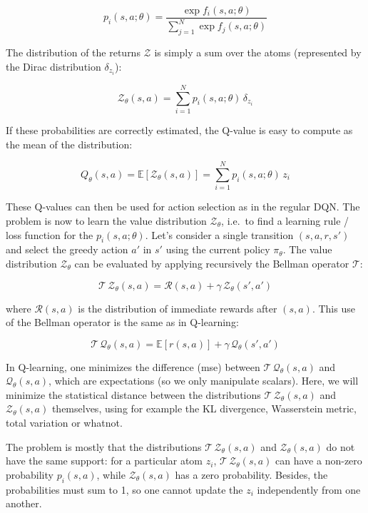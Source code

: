 \documentclass[
  letterpaper,
  DIV=11,
  numbers=noendperiod]{scrreprt}
\begin{document}
\[
    p_i(s, a; \theta) = \frac{\exp f_i(s, a; \theta)}{\sum_{j=1}^{N} \exp f_j(s, a; \theta)}
\]

The distribution of the returns \(\mathcal{Z}\) is simply a sum over the
atoms (represented by the Dirac distribution \(\delta_{z_i}\)):

\[
    \mathcal{Z}_\theta(s, a) = \sum_{i=1}^{N} p_i(s, a; \theta) \, \delta_{z_i}
\]

If these probabilities are correctly estimated, the Q-value is easy to
compute as the mean of the distribution:

\[
    Q_\theta(s, a) = \mathbb{E} [\mathcal{Z}_\theta(s, a)] = \sum_{i=1}^{N} p_i(s, a; \theta) \, z_i
\]

These Q-values can then be used for action selection as in the regular
DQN. The problem is now to learn the value distribution
\(\mathcal{Z}_\theta\), i.e.~to find a learning rule / loss function for
the \(p_i(s, a; \theta)\). Let's consider a single transition
\((s, a, r, s')\) and select the greedy action \(a'\) in \(s'\) using
the current policy \(\pi_\theta\). The value distribution
\(\mathcal{Z}_\theta\) can be evaluated by applying recursively the
Bellman operator \(\mathcal{T}\):

\[
    \mathcal{T} \, \mathcal{Z}_\theta(s, a) = \mathcal{R}(s, a) + \gamma \, \mathcal{Z}_\theta(s', a')
\]

where \(\mathcal{R}(s, a)\) is the distribution of immediate rewards
after \((s, a)\). This use of the Bellman operator is the same as in
Q-learning:

\[
    \mathcal{T} \, \mathcal{Q}_\theta(s, a) = \mathbb{E}[r(s, a)] + \gamma \, \mathcal{Q}_\theta(s', a')
\]

In Q-learning, one minimizes the difference (mse) between
\(\mathcal{T} \, \mathcal{Q}_\theta(s, a)\) and
\(\mathcal{Q}_\theta(s, a)\), which are expectations (so we only
manipulate scalars). Here, we will minimize the statistical distance
between the distributions \(\mathcal{T} \, \mathcal{Z}_\theta(s, a)\)
and \(\mathcal{Z}_\theta(s, a)\) themselves, using for example the KL
divergence, Wasserstein metric, total variation or whatnot.

The problem is mostly that the distributions
\(\mathcal{T} \, \mathcal{Z}_\theta(s, a)\) and
\(\mathcal{Z}_\theta(s, a)\) do not have the same support: for a
particular atom \(z_i\), \(\mathcal{T} \, \mathcal{Z}_\theta(s, a)\) can
have a non-zero probability \(p_i(s, a)\), while
\(\mathcal{Z}_\theta(s, a)\) has a zero probability. Besides, the
probabilities must sum to 1, so one cannot update the \(z_i\)
independently from one another.
\end{document}
